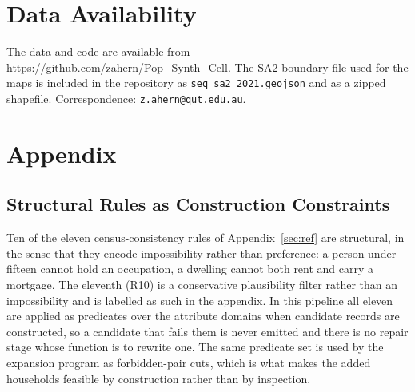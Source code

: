 \documentclass[review]{elsarticle}
\begin{document}





\section{Data Availability}
The data and code are available from \url{https://github.com/zahern/Pop_Synth_Cell}.
The SA2 boundary file used for the maps is included in the repository as
\texttt{seq\_sa2\_2021.geojson} and as a zipped shapefile. Correspondence:
\texttt{z.ahern@qut.edu.au}.
\newpage
\FloatBarrier



\newpage
\section*{Appendix}
\setcounter{section}{1}
\renewcommand{\thesection}{\Alph{section}}
\renewcommand{\thesubsection}{\thesection.\arabic{subsection}}

\subsection{Structural Rules as Construction Constraints}
\label{sec:consistency}
Ten of the eleven census-consistency rules of Appendix~\ref{sec:ref} are structural, in the sense that they encode impossibility rather than preference: a person under fifteen cannot hold an occupation, a dwelling cannot both rent and carry a mortgage. The eleventh (R10) is a conservative plausibility filter rather than an impossibility and is labelled as such in the appendix. In this pipeline all eleven are applied as predicates over the attribute domains when candidate records are constructed, so a candidate that fails them is never emitted and there is no repair stage whose function is to rewrite one. The same predicate set is used by the expansion program as forbidden-pair cuts, which is what makes the added households feasible by construction rather than by inspection.
\end{document}
